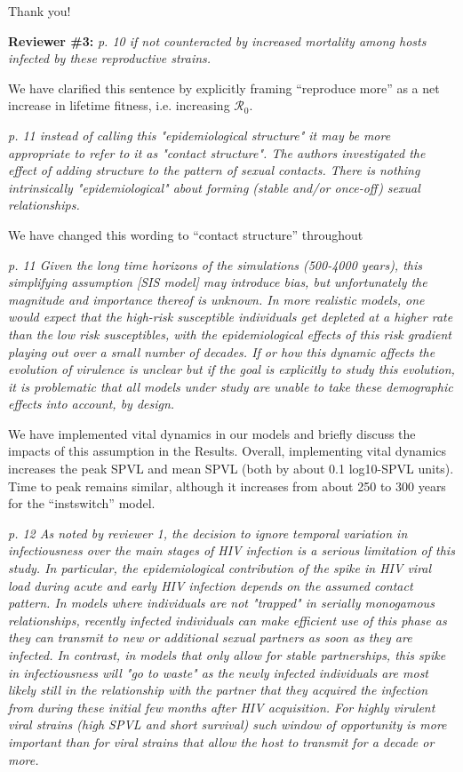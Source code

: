\documentclass[10pt]{letter}
\newcommand{\revcomment}[1]{\emph{#1}}
\newcommand{\response}[1]{#1}
\newcommand{\rzero}{\ensuremath{\mathcal R}_0}
\begin{document}
\begin{letter}{
}
\response{
Thank you!
}

\textbf{Reviewer \#3:}
\revcomment{
p. 10 if not counteracted by increased mortality among hosts infected by these reproductive strains.
}

\response{
We have clarified this sentence by explicitly framing ``reproduce more'' as a net increase in lifetime fitness, i.e. increasing $\rzero$.
}

\revcomment{
p. 11 instead of calling this "epidemiological structure" it may be more appropriate to refer to it as "contact structure". The authors investigated the effect of adding structure to the pattern of sexual contacts. There is nothing intrinsically "epidemiological" about forming (stable and/or once-off) sexual relationships.
}

\response{
  We have changed this wording to ``contact structure'' throughout
}

\revcomment{
p. 11 Given the long time horizons of the simulations (500-4000
years), this simplifying assumption [SIS model] may introduce bias, but unfortunately the magnitude and importance thereof is unknown. In more realistic models, one would expect that the high-risk susceptible individuals get depleted at a higher rate than the low risk susceptibles, with the epidemiological effects of this risk gradient playing out over a small number of decades. If or how this dynamic affects the evolution of virulence is unclear but if the goal is explicitly to study this evolution, it is problematic that all models under study are unable to take these demographic effects into account, by design.
}

\response{
We have implemented vital dynamics in our models and briefly discuss the impacts of this assumption in the Results.
Overall, implementing vital dynamics increases the peak SPVL and mean SPVL (both by about 0.1 log10-SPVL units). 
Time to peak remains similar, although it increases from about 250 to 300 years for the ``instswitch'' model.

}

\revcomment{
p. 12 As noted by reviewer 1, the decision to ignore temporal variation in
infectiousness over the main stages of HIV infection is a serious
limitation of this study. In particular, the epidemiological
contribution of the spike in HIV viral load during acute and early HIV
infection depends on the assumed contact pattern. In models where
individuals are not "trapped" in serially monogamous relationships,
recently infected individuals can make efficient use of this phase as
they can transmit to new or additional sexual partners as soon as they
are infected. In contrast, in models that only allow for stable
partnerships, this spike in infectiousness will "go to waste" as the
newly infected individuals are most likely still in the relationship
with the partner that they acquired the infection from during these
initial few months after HIV acquisition. For highly virulent viral
strains (high SPVL and short survival) such window of opportunity is
more important than for viral strains that allow the host to transmit
for a decade or more.
}


\end{letter}
\end{document}
